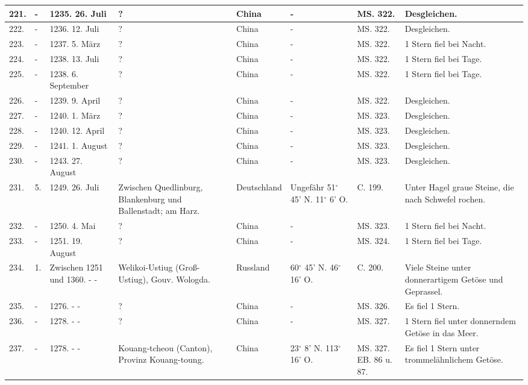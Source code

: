 \documentclass[a4paper, 11pt, oneside, polutonikogreek, german]{article}
\begin{document}
\begin{table}[!ht]
\begin{tabular}{|l|l|l|l|l|l|l|l|}
        221. & - & 1235. 26. Juli & ? & China & - & MS. 322. & Desgleichen. \\ \hline
        222. & - & 1236. 12. Juli & ? & China & - & MS. 322. & Desgleichen. \\ \hline
        223. & - & 1237. 5. März & ? & China & - & MS. 322. & 1 Stern fiel bei Nacht. \\ \hline
        224. & - & 1238. 13. Juli & ? & China & - & MS. 322. & 1 Stern fiel bei Tage. \\ \hline
        225. & - & 1238. 6. September & ? & China & - & MS. 322. & 1 Stern fiel bei Tage. \\ \hline
        226. & - & 1239. 9. April & ? & China & - & MS. 322. & Desgleichen. \\ \hline
        227. & - & 1240. 1. März & ? & China & - & MS. 323. & Desgleichen. \\ \hline
        228. & - & 1240. 12. April & ? & China & - & MS. 323. & Desgleichen. \\ \hline
        229. & - & 1241. 1. August & ? & China & - & MS. 323. & Desgleichen. \\ \hline
        230. & - & 1243. 27. August & ? & China & - & MS. 323. & Desgleichen. \\ \hline
        231. & 5. & 1249. 26. Juli & Zwischen Quedlinburg, Blankenburg und Ballenstadt; am Harz. & Deutschland & Ungefähr 51$^\circ$ 45' N. 11$^\circ$ 6' O. & C. 199. & Unter Hagel graue Steine, die nach Schwefel rochen. \\ \hline
        232. & - & 1250. 4. Mai & ? & China & - & MS. 323. & 1 Stern fiel bei Nacht. \\ \hline
        233. & - & 1251. 19. August & ? & China & - & MS. 324. & 1 Stern fiel bei Tage. \\ \hline
        234. & 1. & Zwischen 1251 und 1360. - - & Welikoi-Ustiug (Groß-Ustiug), Gouv. Wologda. & Russland & 60$^\circ$ 45' N. 46$^\circ$ 16' O. & C. 200. & Viele Steine unter donnerartigem Getöse und Geprassel. \\ \hline
        235. & - & 1276. - - & ? & China & - & MS. 326. & Es fiel 1 Stern. \\ \hline
        236. & - & 1278. - - & ? & China & - & MS. 327. & 1 Stern fiel unter donnerndem Getöse in das Meer. \\ \hline
        237. & - & 1278. - - & Kouang-tcheou (Canton), Provinz Kouang-toung. & China & 23$^\circ$ 8' N. 113$^\circ$ 16' O. & MS. 327. EB. 86 u. 87. & Es fiel 1 Stern unter trommelähnlichem Getöse. \\ \hline

\end{tabular}
\end{table}
\end{document}
